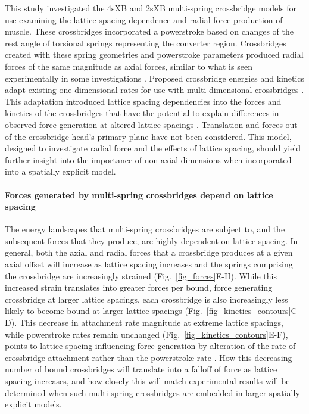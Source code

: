 \documentclass[]{article}
\begin{document}
This study investigated the 4sXB and 2sXB multi-spring crossbridge models for use examining the lattice spacing dependence and radial force production of muscle. 
These crossbridges incorporated a powerstroke based on changes of the rest angle of torsional springs representing the converter region. 
Crossbridges created with these spring geometries and powerstroke parameters produced radial forces of the same magnitude as axial forces, similar to what is seen experimentally in some investigations \citep{Cecchi1990,Brenner1991}. 
Proposed crossbridge energies and kinetics adapt existing one-dimensional rates for use with multi-dimensional crossbridges \citep{Pate1989}.
This adaptation introduced lattice spacing dependencies into the forces and kinetics of the crossbridges that have the potential to explain differences in observed force generation at altered lattice spacings  \citep{Millman1998}. 
Translation and forces out of the crossbridge head's primary plane have not been considered. %
This model, designed to investigate radial force and the effects of lattice spacing, should yield further insight into the importance of non-axial dimensions when incorporated into a spatially explicit model. 

\paragraph{Forces generated by multi-spring crossbridges depend on lattice spacing} %
The energy landscapes that multi-spring crossbridges are subject to, and the subsequent forces that they produce, are highly dependent on lattice spacing.
In general, both the axial and radial forces that a crossbridge produces at a given axial offset will increase as lattice spacing increases and the springs comprising the crossbridge are increasingly strained (Fig.~\ref{fig_forces}E-H). 
While this increased strain translates into greater forces per bound, force generating crossbridge at larger lattice spacings, each crossbridge is also increasingly less likely to become bound at larger lattice spacings (Fig.~\ref{fig_kinetics_contours}C-D).
This decrease in attachment rate magnitude at extreme lattice spacings, while powerstroke rates remain unchanged (Fig.~\ref{fig_kinetics_contours}E-F), points to lattice spacing influencing force generation by alteration of the rate of crossbridge attachment rather than the powerstroke rate \citet{Martyn2004}. 
How this decreasing number of bound crossbridges will translate into a falloff of force as lattice spacing increases, and how closely this will match experimental results will be determined when such multi-spring crossbridges are embedded in larger spatially explicit models. %
\end{document}
